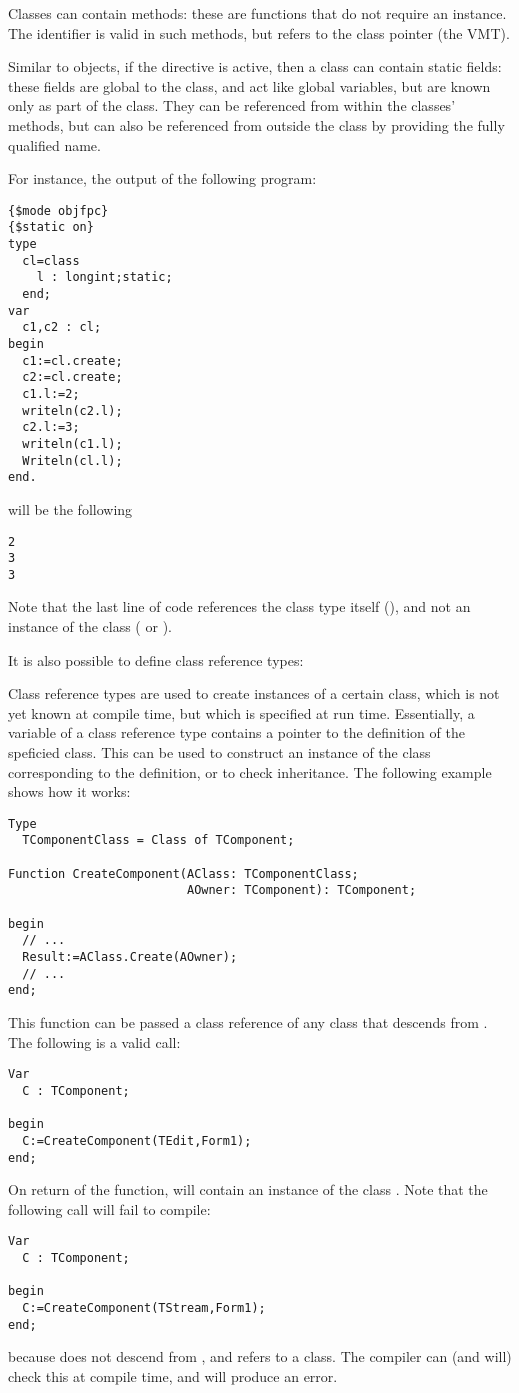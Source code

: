 Classes can contain  methods: these are functions that do not
require an instance. The  identifier is valid in such methods, 
but refers to the class pointer (the VMT). 

Similar to objects, if the  directive is active, then a class
can contain static fields: these fields are global to the class, and act
like global variables, but are known only as part of the class. They can be
referenced from within the classes' methods, but can also be referenced from
outside the class by providing the fully qualified name.

For instance, the output of the following program:
\begin{verbatim}
{$mode objfpc}
{$static on}
type
  cl=class
    l : longint;static;
  end;
var
  c1,c2 : cl;
begin
  c1:=cl.create;
  c2:=cl.create;
  c1.l:=2;
  writeln(c2.l);
  c2.l:=3;
  writeln(c1.l);
  Writeln(cl.l);
end.
\end{verbatim}
will be the following
\begin{verbatim}
2
3
3
\end{verbatim}
Note that the last line of code references the class type itself (), 
and not an instance of the class ( or ).

It is also possible to define class reference types:

Class reference types are used to create instances of a certain class, which
is not yet known at compile time, but which is specified at run time. 
Essentially, a variable of a class reference type contains a pointer to the
definition of the speficied class. This can be used to construct an instance 
of the class corresponding to the definition, or to check inheritance. 
The following example shows how it works:
\begin{verbatim}
Type
  TComponentClass = Class of TComponent;

Function CreateComponent(AClass: TComponentClass; 
                         AOwner: TComponent): TComponent;

begin
  // ...
  Result:=AClass.Create(AOwner);
  // ...
end;
\end{verbatim}
This function can be passed a class reference of any class that descends
from . The following is a valid call:
\begin{verbatim}
Var
  C : TComponent;

begin
  C:=CreateComponent(TEdit,Form1);
end;
\end{verbatim}
On return of the  function,  will contain an 
instance of the class . Note that the following call will fail to
compile:
\begin{verbatim}
Var
  C : TComponent;

begin
  C:=CreateComponent(TStream,Form1);
end;
\end{verbatim}
because  does not descend from , and
 refers to a  class. The compiler can
(and will) check this at compile time, and will produce an error.

